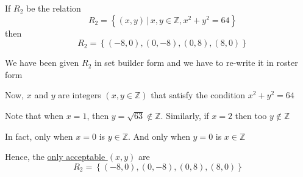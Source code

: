 \documentclass[14pt,fleqn]{extarticle}
\newcommand\Z{\mathbb{Z}}
\begin{document}
 
\begin{snippet}
    \correct
    
    If $R_2$ be the relation 
    \[ \quad R_2 = \left\lbrace (x,y)\,\vert\, x,y\in\mathbb{Z}, x^2 + y^2 = 64 \right\rbrace\]
    then 
    \[ \quad R_2 = \left\lbrace (-8,0),(0,-8),(0,8),(8,0) \right\rbrace\]
    
    \reason
    
    We have been given $R_2$ in set builder form and we have to re-write 
    it in roster form\newline 
    
    Now, $x$ and $y$ are integers $(x,y\in\mathbb{Z})$ that satisfy the condition $x^2 + y^2 = 64$\newline 
    
    Note that when $x = 1$, then $y=\sqrt{63}\notin\Z$. Similarly, if $x = 2$ then too $y\notin\Z$ \newline 
    
    In fact, only when $x = 0$ is $y\in\Z$. And only when $y=0$ is $x\in\Z$\newline 
    
    Hence, the \underline{only acceptable $(x,y)$} are 
    \[ R_2 = \left\lbrace (-8,0),(0,-8),(0,8),(8,0) \right\rbrace\]
    
    
    
\end{snippet} 
\end{document}
